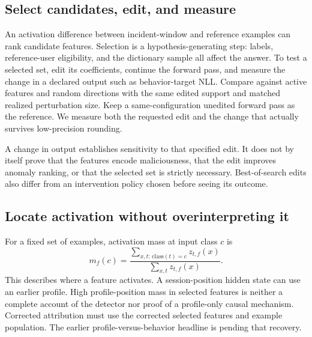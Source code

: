 \subsection{Select candidates, edit, and measure}
An activation difference between incident-window and reference examples can
rank candidate features. Selection is a hypothesis-generating step: labels,
reference-user eligibility, and the dictionary sample all affect the answer.
To test a selected set, edit its coefficients, continue the forward pass, and
measure the change in a declared output such as behavior-target NLL. Compare
against active features and random directions with the same edited support and
matched realized perturbation size. Keep a same-configuration unedited forward
pass as the reference. We measure both the requested edit and the change that
actually survives low-precision rounding.

A change in output establishes sensitivity to that specified edit. It does not
by itself prove that the features encode maliciousness, that the edit improves
anomaly ranking, or that the selected set is strictly necessary. Best-of-search
edits also differ from an intervention policy chosen before seeing its outcome.

\subsection{Locate activation without overinterpreting it}
For a fixed set of examples, activation mass at input class $c$ is
\begin{equation}
 m_f(c)=\frac{\sum_{x,t:\,\mathrm{class}(t)=c}z_{t,f}(x)}
                 {\sum_{x,t}z_{t,f}(x)}.
\end{equation}
This describes where a feature activates. A session-position hidden state can
use an earlier profile. High profile-position mass in selected features is
neither a complete account of the detector nor proof of a profile-only causal
mechanism. Corrected attribution must use the corrected selected features and
example population. The earlier profile-versus-behavior headline is pending
that recovery.
